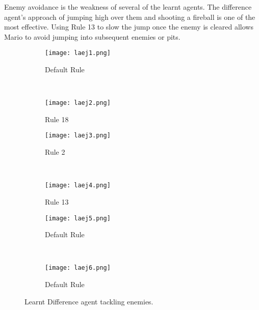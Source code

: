 Enemy avoidance is the weakness of several of the learnt agents. The difference agent's approach of jumping high over them and shooting a fireball is one of the most effective. Using Rule 13 to slow the jump once the enemy is cleared allows Mario to avoid jumping into subsequent enemies or pits.

\begin{figure}[t]
	\begin{adjustwidth}{-2cm}{-2cm}
    \centering
          \begin{subfigure}[b]{0.49\textwidth}
                  \centering
                  \texttt{[image: laej1.png]}
                  \caption{Default Rule}
                  \vspace*{\baselineskip}
          \end{subfigure}~
          \begin{subfigure}[b]{0.49\textwidth}
                  \centering
                  \texttt{[image: laej2.png]}
                  \caption{Rule 18}
                  \vspace*{\baselineskip}
          \end{subfigure}
          \begin{subfigure}[b]{0.49\textwidth}
                  \centering
                  \texttt{[image: laej3.png]}
                  \caption{Rule 2}
                  \vspace*{\baselineskip}
          \end{subfigure}~
          \begin{subfigure}[b]{0.49\textwidth}
                  \centering
                  \texttt{[image: laej4.png]}
                  \caption{Rule 13}
                  \vspace*{\baselineskip}
          \end{subfigure}
          \begin{subfigure}[b]{0.49\textwidth}
                  \centering
                  \texttt{[image: laej5.png]}
                  \caption{Default Rule}
                  \vspace*{\baselineskip}
          \end{subfigure}~
          \begin{subfigure}[b]{0.49\textwidth}
                  \centering
                  \texttt{[image: laej6.png]}
                  \caption{Default Rule}
                  \vspace*{\baselineskip}
          \end{subfigure}
    \caption{Learnt Difference agent tackling enemies.}\label{fig:laej}
    \end{adjustwidth}
\end{figure}


